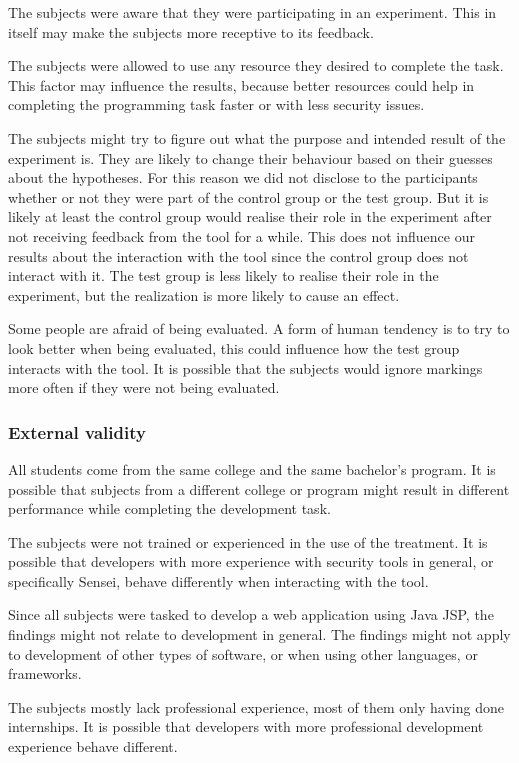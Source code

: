 The subjects were aware that they were participating in an experiment.
This in itself may make the subjects more receptive to its feedback.

The subjects were allowed to use any resource they desired to complete the task.
This factor may influence the results, because better resources could help in completing the programming task faster or with less security issues.

The subjects might try to figure out what the purpose and intended result of the experiment is.
They are likely to change their behaviour based on their guesses about the hypotheses.
For this reason we did not disclose to the participants whether or not they were part of the control group or the test group.
But it is likely at least the control group would realise their role in the experiment after not receiving feedback from the tool for a while.
This does not influence our results about the interaction with the tool since the control group does not interact with it.
The test group is less likely to realise their role in the experiment, but the realization is more likely to cause an effect.

Some people are afraid of being evaluated.
A form of human tendency is to try to look better when being evaluated, this could influence how the test group interacts with the tool.
It is possible that the subjects would ignore markings more often if they were not being evaluated.

\subsubsection{External validity}%
All students come from the same college and the same bachelor's program.
It is possible that subjects from a different college or program might result in different performance while completing the development task.

The subjects were not trained or experienced in the use of the treatment.
It is possible that developers with more experience with security tools in general, or specifically Sensei, behave differently when interacting with the tool.

Since all subjects were tasked to develop a web application using Java JSP, the findings might not relate to development in general.
The findings might not apply to development of other types of software, or when using other languages, or frameworks. 

The subjects mostly lack professional experience, most of them only having done internships.
It is possible that developers with more professional development experience behave different.